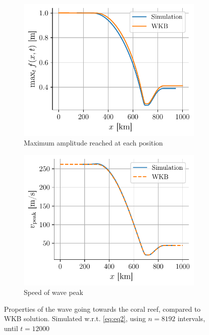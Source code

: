 \begin{figure}[h]
    \centering
    \begin{subfigure}{0.48\linewidth}
        \centering
        \includegraphics[width=\linewidth]{figures/corail_eq2_amplitude_wkb.pdf}
        \caption{Maximum amplitude reached at each position}
        \label{fig:corail_eq2_amplitude}
    \end{subfigure}
    \begin{subfigure}{0.48\linewidth}
        \centering
        \includegraphics[width=\linewidth]{figures/corail_eq2_vitesse_wkb.pdf}
        \caption{Speed of wave peak}
        \label{fig:corail_eq2_vitesse}
    \end{subfigure}
    \caption{Properties of the wave going towards the coral reef, compared to WKB solution. Simulated w.r.t. \autoref{eq:eq2}, using \(n=8192\) intervals, until \(t=12000\)}
    \label{fig:corail_eq2_properties}
\end{figure}